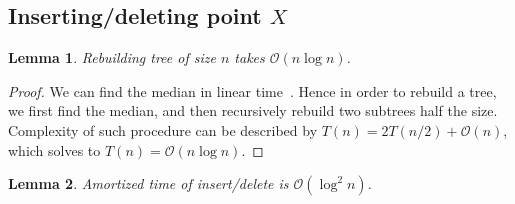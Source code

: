 \documentclass[10pt,a4paper]{article}
\newtheorem{lemma}{Lemma}
\newcommand{\Oh}{\mathcal{O}}
\begin{document}
\subsection{Inserting/deleting point $X$}

\begin{lemma}\label{lem:1}
Rebuilding tree of size $n$ takes $\Oh(n \log n)$.
\end{lemma}

\begin{proof}
We can find the median in linear time~\cite{FIVE}. Hence in order to rebuild a tree, we first find the median, and then recursively rebuild two subtrees half the size. Complexity of such procedure can be described by $T(n) = 2 T(n/2) + \Oh(n)$, which solves to $T(n) = \Oh(n \log n).$
\end{proof}

\begin{lemma}\label{lem:2}
Amortized time of insert/delete is $\Oh(\log^2 n)$.
\end{lemma}
\end{document}
